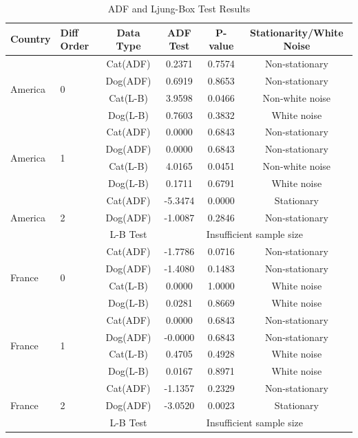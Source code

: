 \documentclass[withoutpreface,bwprint]{cumcmthesis} %
\begin{document}
\clearpage
\begin{table}[htbp]
\small %
\centering
\caption{ADF and Ljung-Box Test Results}
\begin{tabular}{llcccc}
\toprule
Country & Diff Order & Data Type & ADF Test & P-value & Stationarity/White Noise \\
\midrule
\multirow{4}{*}{America} & \multirow{4}{*}{0} & Cat(ADF) & 0.2371 & 0.7574 & Non-stationary \\
& & Dog(ADF) & 0.6919 & 0.8653 & Non-stationary \\
& & Cat(L-B) & 3.9598 & 0.0466 & Non-white noise \\
& & Dog(L-B) & 0.7603 & 0.3832 & White noise \\
\midrule
\multirow{4}{*}{America} & \multirow{4}{*}{1} & Cat(ADF) & 0.0000 & 0.6843 & Non-stationary \\
& & Dog(ADF) & 0.0000 & 0.6843 & Non-stationary \\
& & Cat(L-B) & 4.0165 & 0.0451 & Non-white noise \\
& & Dog(L-B) & 0.1711 & 0.6791 & White noise \\
\midrule
\multirow{3}{*}{America} & \multirow{3}{*}{2} & Cat(ADF) & -5.3474 & 0.0000 & Stationary \\
& & Dog(ADF) & -1.0087 & 0.2846 & Non-stationary \\
& & L-B Test & \multicolumn{3}{c}{Insufficient sample size} \\
\midrule
\multirow{4}{*}{France} & \multirow{4}{*}{0} & Cat(ADF) & -1.7786 & 0.0716 & Non-stationary \\
& & Dog(ADF) & -1.4080 & 0.1483 & Non-stationary \\
& & Cat(L-B) & 0.0000 & 1.0000 & White noise \\
& & Dog(L-B) & 0.0281 & 0.8669 & White noise \\
\midrule
\multirow{4}{*}{France} & \multirow{4}{*}{1} & Cat(ADF) & 0.0000 & 0.6843 & Non-stationary \\
& & Dog(ADF) & -0.0000 & 0.6843 & Non-stationary \\
& & Cat(L-B) & 0.4705 & 0.4928 & White noise \\
& & Dog(L-B) & 0.0167 & 0.8971 & White noise \\
\midrule
\multirow{3}{*}{France} & \multirow{3}{*}{2} & Cat(ADF) & -1.1357 & 0.2329 & Non-stationary \\
& & Dog(ADF) & -3.0520 & 0.0023 & Stationary \\
& & L-B Test & \multicolumn{3}{c}{Insufficient sample size} \\

\end{tabular}
\end{table}
\end{document}
